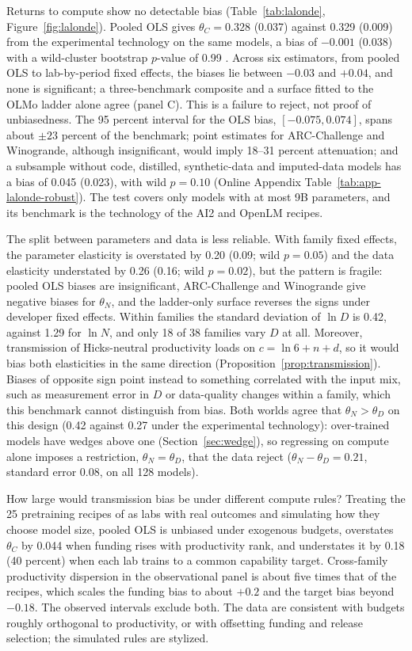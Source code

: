 Returns to compute show no detectable bias (Table~\ref{tab:lalonde}, Figure~\ref{fig:lalonde}). Pooled OLS gives
$\theta_C=0.328$ (0.037) against 0.329 (0.009) from the experimental technology on the same models, a bias of
$-0.001$ (0.038) with a wild-cluster bootstrap $p$-value of 0.99 \citep{cameron2008bootstrap,webb2023reworking}. Across
six estimators, from pooled OLS to lab-by-period fixed effects, the biases lie between $-0.03$ and $+0.04$, and none is
significant; a three-benchmark composite and a surface fitted to the OLMo ladder alone agree (panel C). This is a
failure to
reject, not proof of unbiasedness. The 95 percent interval for the OLS bias, $[-0.075,0.074]$, spans about $\pm23$
percent of the benchmark; point estimates for ARC-Challenge and Winogrande, although insignificant, would imply 18--31
percent attenuation; and a subsample without code, distilled, synthetic-data and imputed-data models has a bias of 0.045
(0.023), with wild $p=0.10$ (Online Appendix Table~\ref{tab:app-lalonde-robust}). The test covers only models with at most 9B parameters, and its benchmark is the technology
of the AI2 and OpenLM recipes.

The split between parameters and data is less reliable. With family fixed effects, the parameter elasticity is
overstated by 0.20 (0.09; wild $p=0.05$) and the data elasticity understated by 0.26 (0.16; wild $p=0.02$), but the
pattern is fragile: pooled OLS biases are insignificant, ARC-Challenge and Winogrande give negative biases for
$\theta_N$, and the ladder-only surface reverses the signs under developer fixed effects. Within families the standard
deviation of $\ln D$ is 0.42, against 1.29 for $\ln N$, and only 18 of 38 families vary $D$ at all. Moreover,
transmission of Hicks-neutral productivity loads on $c=\ln6+n+d$, so it would bias both elasticities in the same
direction (Proposition~\ref{prop:transmission}). Biases of opposite sign point instead to something correlated with the
input mix, such as measurement error in $D$ or data-quality changes within a family, which this benchmark cannot
distinguish from bias. Both worlds agree that $\theta_N>\theta_D$ on this design (0.42 against 0.27 under the
experimental technology): over-trained models have wedges above one (Section~\ref{sec:wedge}), so regressing on
compute alone imposes a restriction, $\theta_N=\theta_D$, that the data reject ($\theta_N-\theta_D=0.21$, standard error
0.08, on all 128 models).

How large would transmission bias be under different compute rules? Treating the 25 pretraining recipes of
\citet{magnusson2025datadecide} as labs with real outcomes and simulating how they choose model size, pooled OLS is
unbiased under exogenous budgets, overstates $\theta_C$ by 0.044 when funding rises with productivity rank, and
understates it by 0.18 (40 percent) when each lab trains to a common capability target. Cross-family productivity
dispersion in the observational panel is about five times that of the recipes, which scales the funding bias to about
$+0.2$ and the target bias beyond $-0.18$. The observed intervals exclude both. The data are consistent with budgets
roughly orthogonal to productivity, or with offsetting funding and release selection; the simulated rules are stylized.


